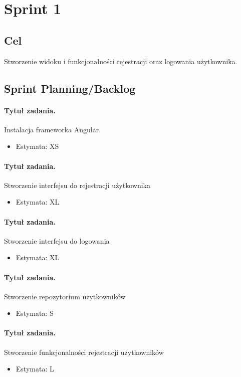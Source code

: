 ﻿\documentclass[a4paper]{article}
\begin{document}
\section{Sprint 1}
\subsection{Cel} Stworzenie widoku i funkcjonalności rejestracji oraz logowania 	użytkownika.
\subsection{Sprint Planning/Backlog}

\paragraph{Tytuł zadania.} Instalacja frameworka Angular.
\begin{itemize}
\item Estymata: XS
\end{itemize}

\paragraph{Tytuł zadania.} Stworzenie interfejsu do rejestracji użytkownika
\begin{itemize}
\item Estymata: XL
\end{itemize}

\paragraph{Tytuł zadania.} Stworzenie interfejsu do logowania 
\begin{itemize}
\item Estymata: XL
\end{itemize}

\paragraph{Tytuł zadania.} Stworzenie repozytorium użytkowników
\begin{itemize}
\item Estymata: S
\end{itemize}

\paragraph{Tytuł zadania.} Stworzenie funkcjonalności rejestracji użytkowników
\begin{itemize}
\item Estymata: L
\end{itemize}
\end{document}
